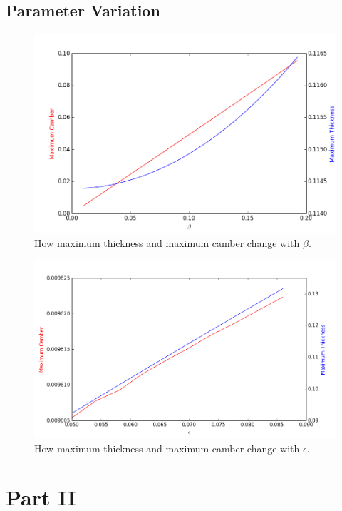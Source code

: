 \documentclass[10pt,a4paper]{article}
\begin{document}
\subsection{Parameter Variation}
\begin{figure}[!htb]
\centering
\includegraphics[scale=0.6]{Figures/beta_variation.png}
\caption{How maximum thickness and maximum camber change with $\beta$.}
\label{fig:beta_variation}
\end{figure}
\begin{figure}[!htb]
\centering
\includegraphics[scale=0.6]{Figures/epsilon_variation.png}
\caption{How maximum thickness and maximum camber change with $\epsilon$.}
\label{fig:epsilon_variation}
\end{figure}
\section{Part II}
\end{document}
